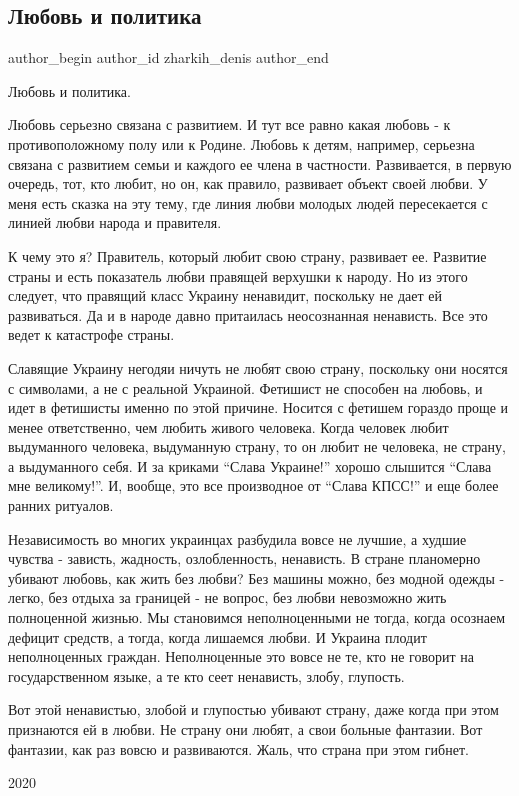  
 
 
 
 
 
\subsection{Любовь и политика}
\label{sec:11_01_2022.fb.zharkih_denis.1.ljubov_i_politika}
 
\ifcmt
 author_begin
   author_id zharkih_denis
 author_end
\fi

Любовь и политика.

Любовь серьезно связана с развитием. И тут все равно какая любовь - к
противоположному полу или к Родине. Любовь к детям, например, серьезна связана
с развитием семьи и каждого ее члена в частности. Развивается, в первую очередь,
тот, кто любит, но он, как правило, развивает объект своей любви. У меня есть
сказка на эту тему, где линия любви молодых людей пересекается с линией любви
народа и правителя. 

К чему это я? Правитель, который любит свою страну, развивает ее. Развитие
страны и есть показатель любви правящей верхушки к народу. Но из этого следует,
что правящий класс Украину ненавидит, поскольку не дает ей развиваться. Да и в
народе давно притаилась неосознанная ненависть. Все это ведет к катастрофе
страны.

Славящие Украину негодяи ничуть не любят свою страну, поскольку они носятся с
символами, а не с реальной Украиной. Фетишист не способен на любовь, и идет в
фетишисты именно по этой причине. Носится с фетишем гораздо проще и менее
ответственно, чем любить живого человека.  Когда человек любит выдуманного
человека, выдуманную страну, то он любит не человека, не страну, а выдуманного
себя. И за криками \enquote{Слава Украине!} хорошо слышится \enquote{Слава мне великому!}. И,
вообще, это все производное от \enquote{Слава КПСС!} и еще более ранних ритуалов. 

Независимость во многих украинцах разбудила вовсе не лучшие, а худшие чувства -
зависть, жадность, озлобленность, ненависть. В стране планомерно убивают
любовь, как жить без любви? Без машины можно, без модной одежды - легко, без
отдыха за границей - не вопрос, без любви невозможно жить полноценной жизнью.
Мы становимся неполноценными не тогда, когда осознаем дефицит средств, а тогда,
когда лишаемся любви. И Украина плодит неполноценных граждан. Неполноценные это
вовсе не те, кто не говорит на государственном языке, а те кто сеет ненависть,
злобу, глупость. 

Вот этой ненавистью, злобой и глупостью убивают страну, даже когда при этом
признаются ей в любви. Не страну они любят, а свои больные фантазии. Вот
фантазии, как раз вовсю и развиваются. Жаль, что страна при этом гибнет.

2020

